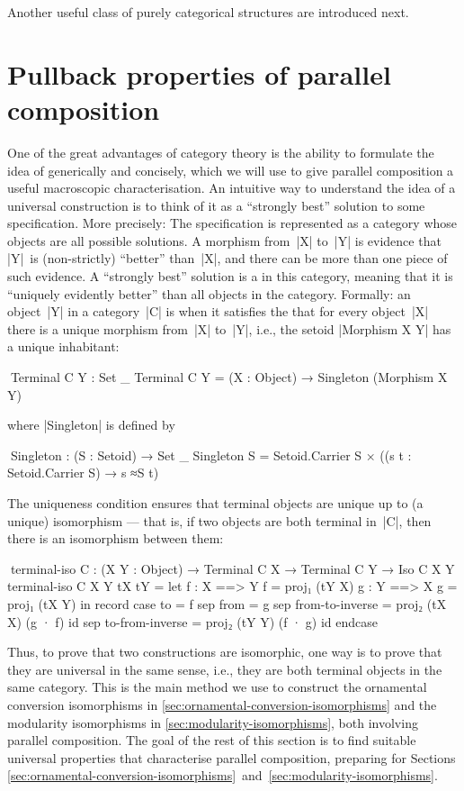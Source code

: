 Another useful class of purely categorical structures are introduced next.

\section{Pullback properties of parallel composition}
\label{sec:parallel-composition-pullback}

One of the great advantages of category theory is the ability to formulate the idea of  generically and concisely, which we will use to give parallel composition a useful macroscopic characterisation.
An intuitive way to understand the idea of a universal construction is to think of it as a ``strongly best'' solution to some specification.
More precisely:
The specification is represented as a category whose objects are all possible solutions.
A morphism from~|X| to~|Y| is evidence that |Y|~is (non-strictly) ``better'' than~|X|, and there can be more than one piece of such evidence.
A ``strongly best'' solution is a  in this category, meaning that it is ``uniquely evidently better'' than all objects in the category.
Formally: an object~|Y| in a category~|C| is  when it satisfies the  that for every object~|X| there is a unique morphism from~|X| to~|Y|, i.e., the setoid |Morphism X Y| has a unique inhabitant:
\begin{code}
^^^Terminal C Y : Set _
Terminal C Y = (X : Object) → Singleton (Morphism X Y)
\end{code}
where |Singleton| is defined by
\begin{code}
^^^Singleton : (S : Setoid) → Set _
Singleton S = Setoid.Carrier S × ((s t : Setoid.Carrier S) → s ≈S t)
\end{code}
The uniqueness condition ensures that terminal objects are unique up to (a unique) isomorphism --- that is, if two objects are both terminal in~|C|, then there is an isomorphism between them:
\begin{code}
^^^terminal-iso C : (X Y : Object) → Terminal C X → Terminal C Y → Iso C X Y
terminal-iso C X Y tX tY =
  let  f : X ==> Y
       f = proj₁ (tY  X)
       g : Y ==> X
       g = proj₁ (tX  Y)
  in   record  case  to    = f
               sep   from  = g
               sep   from-to-inverse  = proj₂ (tX  X)  (g · f) id
               sep   to-from-inverse  = proj₂ (tY  Y)  (f · g) id endcase
\end{code}
Thus, to prove that two constructions are isomorphic, one way is to prove that they are universal in the same sense, i.e., they are both terminal objects in the same category.
This is the main method we use to construct the ornamental conversion isomorphisms in \autoref{sec:ornamental-conversion-isomorphisms} and the modularity isomorphisms in \autoref{sec:modularity-isomorphisms}, both involving parallel composition.
The goal of the rest of this section is to find suitable universal properties that characterise parallel composition, preparing for Sections \ref{sec:ornamental-conversion-isomorphisms}~and~\ref{sec:modularity-isomorphisms}.

